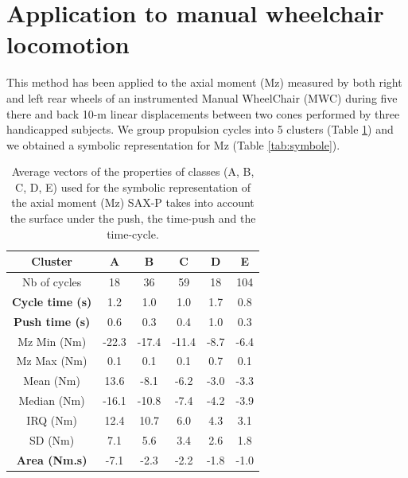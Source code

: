 
\section{Application to manual wheelchair locomotion}
This method has been applied to the axial moment (Mz) measured by both right and left rear wheels of
an instrumented Manual WheelChair (MWC) during five there and back 10-m linear displacements between
two cones performed by three handicapped subjects. We group propulsion cycles into 5 clusters  (Table
\ref{tab:centroide}) and we obtained a symbolic representation for Mz (Table
\ref{tab:symbole}).




\begin{table}
\center
\begin{tabular}{|c|c|c|c|c|c|}
\hline 
Cluster & A & B & C & D & E\tabularnewline
\hline 
\hline 
Nb of cycles & 18 & 36 & 59 & 18 & 104\tabularnewline
\hline 
\textbf{Cycle time (s)} & 1.2 & 1.0 & 1.0 & 1.7 & 0.8\tabularnewline
\hline 
\textbf{Push time (s)} & 0.6 & 0.3 & 0.4 & 1.0 & 0.3\tabularnewline
\hline 
Mz Min (Nm) & -22.3 & -17.4 & -11.4 & -8.7 & -6.4\tabularnewline
\hline 
Mz Max (Nm) & 0.1 & 0.1 & 0.1 & 0.7 & 0.1\tabularnewline
\hline 
Mean (Nm) & 13.6 & -8.1 & -6.2 & -3.0 & -3.3\tabularnewline
\hline 
Median (Nm) & -16.1 & -10.8 & -7.4 & -4.2 & -3.9\tabularnewline
\hline 
IRQ (Nm) & 12.4 & 10.7 & 6.0 & 4.3 & 3.1\tabularnewline
\hline 
SD (Nm) & 7.1 & 5.6 & 3.4 & 2.6 & 1.8\tabularnewline
\hline 
\textbf{Area (Nm.s)} & -7.1 & -2.3 & -2.2 & -1.8 & -1.0\tabularnewline
\hline 
\end{tabular}\protect\caption{Average vectors of the properties of classes (A, B, C, D, E) used
for the symbolic representation of the axial moment (Mz) SAX-P takes into account 
the surface under the push, the time-push and
the time-cycle.}
\label{tab:centroide}
\end{table}





